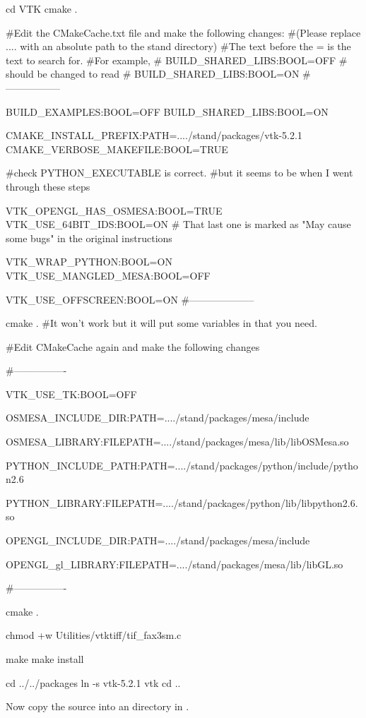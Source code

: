 \begin{shellCode}
cd VTK
cmake .

#Edit the CMakeCache.txt file and make the following changes: 
#(Please replace .... with an absolute path to the stand directory)
#The text before the = is the text to search for.
#For example, 
#   BUILD_SHARED_LIBS:BOOL=OFF
# should be changed to read
#   BUILD_SHARED_LIBS:BOOL=ON
#-----------------

BUILD_EXAMPLES:BOOL=OFF
BUILD_SHARED_LIBS:BOOL=ON

CMAKE_INSTALL_PREFIX:PATH=..../stand/packages/vtk-5.2.1
CMAKE_VERBOSE_MAKEFILE:BOOL=TRUE

#check PYTHON_EXECUTABLE is correct.
#but it seems to be when I went through these steps

VTK_OPENGL_HAS_OSMESA:BOOL=TRUE
VTK_USE_64BIT_IDS:BOOL=ON
# That last one is marked as "May cause some bugs" in the original instructions

VTK_WRAP_PYTHON:BOOL=ON
VTK_USE_MANGLED_MESA:BOOL=OFF

VTK_USE_OFFSCREEN:BOOL=ON
#--------------------

cmake .
#It won't work but it will put some variables in that you need.

#Edit CMakeCache again and make the following changes

#----------------

VTK_USE_TK:BOOL=OFF

OSMESA_INCLUDE_DIR:PATH=..../stand/packages/mesa/include

OSMESA_LIBRARY:FILEPATH=..../stand/packages/mesa/lib/libOSMesa.so

PYTHON_INCLUDE_PATH:PATH=..../stand/packages/python/include/python2.6

PYTHON_LIBRARY:FILEPATH=..../stand/packages/python/lib/libpython2.6.so

OPENGL_INCLUDE_DIR:PATH=..../stand/packages/mesa/include

OPENGL_gl_LIBRARY:FILEPATH=..../stand/packages/mesa/lib/libGL.so

#----------------

cmake .

chmod +w Utilities/vtktiff/tif_fax3sm.c

make
make install


cd ../../packages
ln -s vtk-5.2.1 vtk
cd ..
\end{shellCode}

Now copy the \esfinley source into an  directory in .

